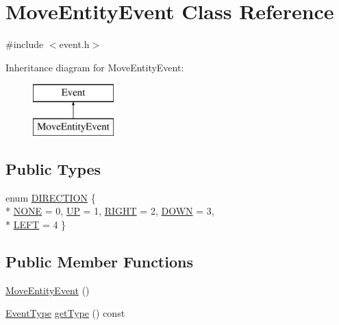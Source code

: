 \hypertarget{classMoveEntityEvent}{\section{Move\-Entity\-Event Class Reference}
\label{classMoveEntityEvent}
}


{\ttfamily \#include $<$event.\-h$>$}

Inheritance diagram for Move\-Entity\-Event\-:\begin{figure}[H]
\begin{center}
\leavevmode
\includegraphics[height=2.000000cm]{classMoveEntityEvent}
\end{center}
\end{figure}
\subsection*{Public Types}
\begin{DoxyCompactItemize}
\item 
enum \hyperlink{classMoveEntityEvent_a7058a943643bee9164a21e62e3392807}{D\-I\-R\-E\-C\-T\-I\-O\-N} \{ \\*
\hyperlink{classMoveEntityEvent_a7058a943643bee9164a21e62e3392807a15b0c6b8a581c4dbda78987169ae5f01}{N\-O\-N\-E} = 0, 
\hyperlink{classMoveEntityEvent_a7058a943643bee9164a21e62e3392807aeef1cc5f9516b00bb914bd41a8e6b5af}{U\-P} = 1, 
\hyperlink{classMoveEntityEvent_a7058a943643bee9164a21e62e3392807ab4b62f7c78d9716e7a25b52216ab5695}{R\-I\-G\-H\-T} = 2, 
\hyperlink{classMoveEntityEvent_a7058a943643bee9164a21e62e3392807af65f060ef91fd8719accae8025ffb053}{D\-O\-W\-N} = 3, 
\\*
\hyperlink{classMoveEntityEvent_a7058a943643bee9164a21e62e3392807ae59ae25b0255eaf1ca0a083301281d7a}{L\-E\-F\-T} = 4
 \}
\end{DoxyCompactItemize}
\subsection*{Public Member Functions}
\begin{DoxyCompactItemize}
\item 
\hyperlink{classMoveEntityEvent_a93c85bd427bb61b888a5e11a6b9a9c89}{Move\-Entity\-Event} ()
\item 
\hyperlink{event_8h_a2628ea8d12e8b2563c32f05dc7fff6fa}{Event\-Type} \hyperlink{classEvent_ab0c2e30730d5859851f3126258c0126e}{get\-Type} () const 
\end{DoxyCompactItemize}
